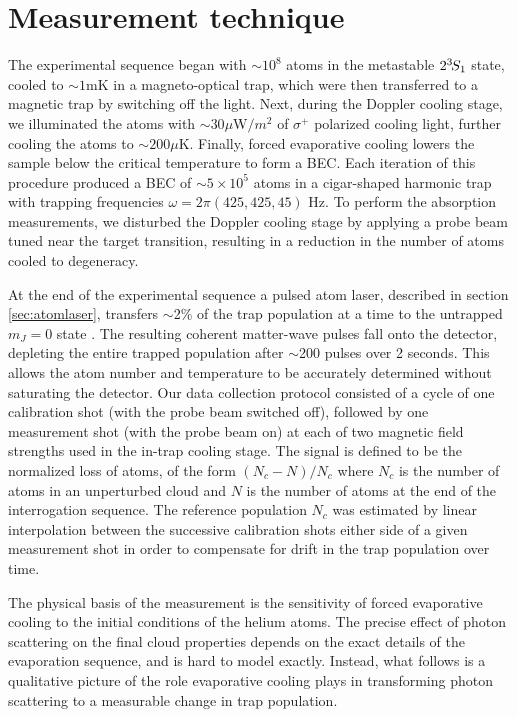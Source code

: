 \section{Measurement technique}

	The experimental sequence began with $\sim10^8$ atoms in the metastable $2^{3\!} S_1$ state, cooled to  $\sim1 \textrm{mK}$ in a magneto-optical trap, which were then transferred to a magnetic trap by switching off the light.
	Next, during the Doppler cooling stage, we illuminated the atoms with $\sim$30$\mu$W$/m^2$ of $\sigma^+$ polarized cooling light, further cooling the atoms to $\sim200\mu \textrm{K}$.
	Finally, forced evaporative cooling lowers the sample below the critical temperature to form a BEC.
	Each iteration of this procedure produced a BEC of $\sim 5\times10^5$ atoms in a cigar-shaped harmonic trap with trapping frequencies $\omega = 2\pi (425,425,45)$ Hz.
	To perform the absorption measurements, we disturbed the Doppler cooling stage by applying a probe beam tuned near the target transition, resulting in a reduction in the number of atoms cooled to degeneracy. 
	

	At the end of the experimental sequence a pulsed atom laser, described in section \ref{sec:atomlaser}, transfers $\sim$2\% of the trap population at a time to the untrapped $m_J=0$ state \cite{Manning10,Henson18_BCR}.
	The resulting coherent matter-wave pulses fall onto the detector, {depleting the entire trapped population after $\sim$200 pulses over 2 seconds.
	This allows}  the atom number and temperature to be accurately determined without saturating the detector.
	Our data collection protocol consisted of a cycle of one calibration shot (with the probe beam switched off), followed by one measurement shot (with the probe beam on) at each of two magnetic field strengths used in the in-trap cooling stage.
	The signal is defined to be the normalized loss of atoms, of the form $(N_c-N)/N_c$ where $N_c$ is the number of atoms in an unperturbed cloud and $N$ is the number of atoms at the end of the interrogation sequence.  
	The reference population $N_c$ was estimated by linear interpolation between the successive calibration shots either side of a given measurement shot in order to compensate for drift in the trap population over time.
	
	The physical basis of the measurement is the sensitivity of forced evaporative cooling to the initial conditions of the helium atoms.
	The precise effect of photon scattering on the final cloud properties depends on the exact details of the evaporation sequence, and is hard to model exactly.
	Instead, what follows is a qualitative picture of the role evaporative cooling plays in transforming photon scattering to a measurable change in trap population.

